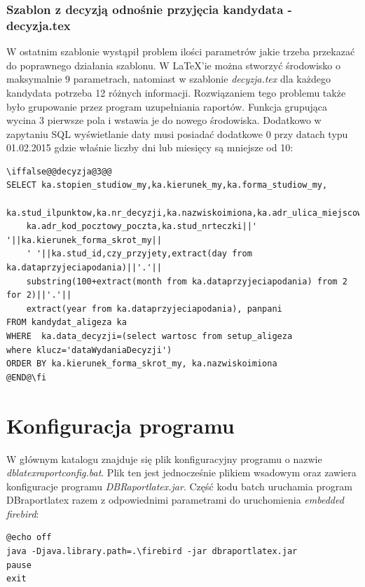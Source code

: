 \subsubsection*{Szablon z decyzją odnośnie przyjęcia kandydata - decyzja.tex}
W ostatnim szablonie wystąpił problem ilości parametrów jakie trzeba przekazać do poprawnego działania szablonu. W LaTeX'ie można stworzyć środowisko o maksymalnie 9 parametrach, natomiast w szablonie \emph{decyzja.tex} dla każdego kandydata potrzeba 12 różnych informacji. Rozwiązaniem tego problemu także było grupowanie przez program uzupełniania raportów. Funkcja grupująca wycina 3 pierwsze pola i wstawia je do nowego środowiska. Dodatkowo w zapytaniu SQL wyświetlanie daty musi posiadać dodatkowe 0 przy datach typu 01.02.2015 gdzie właśnie liczby dni lub miesięcy są mniejsze od 10:
 \begin{lstlisting}
\iffalse@@decyzja@3@@
SELECT ka.stopien_studiow_my,ka.kierunek_my,ka.forma_studiow_my,
	ka.stud_ilpunktow,ka.nr_decyzji,ka.nazwiskoimiona,ka.adr_ulica_miejscowosc_nr_domu,
	ka.adr_kod_pocztowy_poczta,ka.stud_nrteczki||' '||ka.kierunek_forma_skrot_my||
	' '||ka.stud_id,czy_przyjety,extract(day from ka.dataprzyjeciapodania)||'.'||
	substring(100+extract(month from ka.dataprzyjeciapodania) from 2 for 2)||'.'||
	extract(year from ka.dataprzyjeciapodania), panpani
FROM kandydat_aligeza ka 
WHERE  ka.data_decyzji=(select wartosc from setup_aligeza 
where klucz='dataWydaniaDecyzji')
ORDER BY ka.kierunek_forma_skrot_my, ka.nazwiskoimiona
@END@\fi
\end{lstlisting}

\section{Konfiguracja programu}

W głównym katalogu znajduje się plik konfiguracyjny programu o nazwie  \emph{dblatexraportconfig.bat}. Plik ten jest jednocześnie plikiem wsadowym oraz zawiera konfiguracje programu \emph{DBRaportlatex.jar}. Część kodu batch uruchamia program DBraportlatex razem z odpowiednimi parametrami do uruchomienia \emph{embedded firebird}:
 \begin{lstlisting}
@echo off
java -Djava.library.path=.\firebird -jar dbraportlatex.jar
pause
exit
\end{lstlisting}


